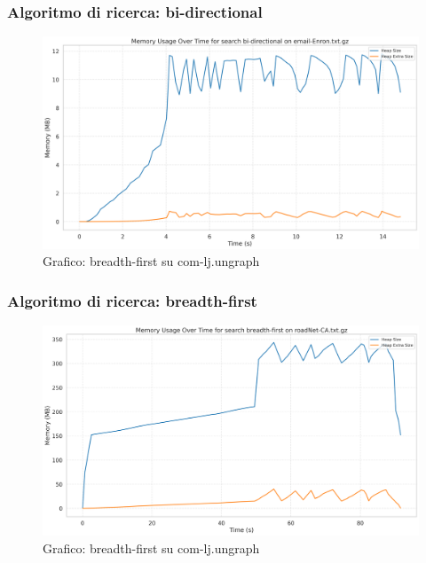\documentclass{article}
\begin{document}
\subsubsection{Algoritmo di ricerca: bi-directional}
\begin{figure}[h]\centering
	\includegraphics[width=\textwidth]{../plots/email-Enron_bi-directional.png}
	\caption{Grafico: breadth-first su com-lj.ungraph}
\end{figure}
\subsubsection{Algoritmo di ricerca: breadth-first}
\begin{figure}[h]\centering
	\includegraphics[width=\textwidth]{../plots/roadNet-CA_breadth-first.png}
	\caption{Grafico: breadth-first su com-lj.ungraph}
\end{figure}
\end{document}
